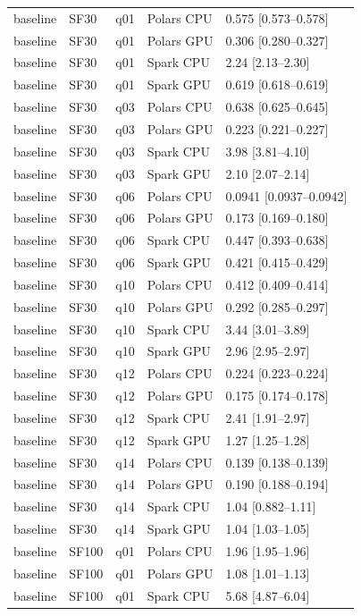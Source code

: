 \begin{longtable}{lllll}
baseline & SF30 & q01 & Polars CPU & 0.575 [0.573--0.578] \\
baseline & SF30 & q01 & Polars GPU & 0.306 [0.280--0.327] \\
baseline & SF30 & q01 & Spark CPU & 2.24 [2.13--2.30] \\
baseline & SF30 & q01 & Spark GPU & 0.619 [0.618--0.619] \\
baseline & SF30 & q03 & Polars CPU & 0.638 [0.625--0.645] \\
baseline & SF30 & q03 & Polars GPU & 0.223 [0.221--0.227] \\
baseline & SF30 & q03 & Spark CPU & 3.98 [3.81--4.10] \\
baseline & SF30 & q03 & Spark GPU & 2.10 [2.07--2.14] \\
baseline & SF30 & q06 & Polars CPU & 0.0941 [0.0937--0.0942] \\
baseline & SF30 & q06 & Polars GPU & 0.173 [0.169--0.180] \\
baseline & SF30 & q06 & Spark CPU & 0.447 [0.393--0.638] \\
baseline & SF30 & q06 & Spark GPU & 0.421 [0.415--0.429] \\
baseline & SF30 & q10 & Polars CPU & 0.412 [0.409--0.414] \\
baseline & SF30 & q10 & Polars GPU & 0.292 [0.285--0.297] \\
baseline & SF30 & q10 & Spark CPU & 3.44 [3.01--3.89] \\
baseline & SF30 & q10 & Spark GPU & 2.96 [2.95--2.97] \\
baseline & SF30 & q12 & Polars CPU & 0.224 [0.223--0.224] \\
baseline & SF30 & q12 & Polars GPU & 0.175 [0.174--0.178] \\
baseline & SF30 & q12 & Spark CPU & 2.41 [1.91--2.97] \\
baseline & SF30 & q12 & Spark GPU & 1.27 [1.25--1.28] \\
baseline & SF30 & q14 & Polars CPU & 0.139 [0.138--0.139] \\
baseline & SF30 & q14 & Polars GPU & 0.190 [0.188--0.194] \\
baseline & SF30 & q14 & Spark CPU & 1.04 [0.882--1.11] \\
baseline & SF30 & q14 & Spark GPU & 1.04 [1.03--1.05] \\
baseline & SF100 & q01 & Polars CPU & 1.96 [1.95--1.96] \\
baseline & SF100 & q01 & Polars GPU & 1.08 [1.01--1.13] \\
baseline & SF100 & q01 & Spark CPU & 5.68 [4.87--6.04] \\

\end{longtable}
